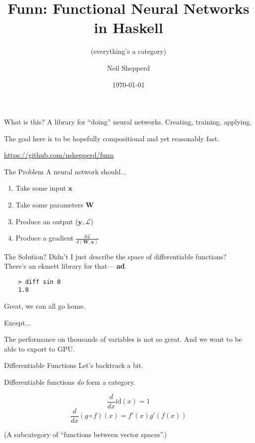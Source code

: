 \documentclass[10pt]{beamer}
\title{Funn: Functional Neural Networks in Haskell}
\subtitle{(everything's a category)}
\date{\today}
\author{Neil Shepperd}
\newenvironment{xframe}[1][]{\begin{frame}[fragile,environment=xframe,#1]}{\end{frame}}
\begin{document}
\maketitle

\begin{xframe}{What is this?}
  A library for ``doing'' neural networks. Creating, training, applying.

  The goal here is to be hopefully compositional and yet reasonably fast.

  \url{https://github.com/nshepperd/funn}
\end{xframe}

\begin{xframe}{The Problem}
  A neural network should...
  \pause
  \begin{enumerate}
  \item Take some input $\mathbf{x}$ \pause
  \item Take some parameters $\mathbf{W}$ \pause
  \item Produce an output ($\mathbf{y}, \mathcal{L}$) \pause
  \item Produce a gradient $\frac{d\mathcal{L}}{d(\mathbf{W},\mathbf{x})}$
  \end{enumerate}
\end{xframe}

\begin{xframe}{The Solution?}
  Didn't I just describe the space of differentiable functions? \\
  There's an ekmett library for that\texttrademark \pause --- \textbf{ad}.

  \begin{verbatim}
    > diff sin 0
    1.0
  \end{verbatim}

  Great, we can all go home.

  Except...
  \pause

  The performance on thousands of variables is not so great.
  And we want to be able to export to GPU.
\end{xframe}

\begin{xframe}{Differentiable Functions}
  Let's backtrack a bit.

  Differentiable functions \emph{do} form a category.

  \[ \frac{d}{dx} \text{id}(x) = 1 \]
  \[ \frac{d}{dx} (g \circ f)(x) = f'(x) g'(f(x)) \]

  (A subcategory of ``functions between vector spaces''.)
\end{xframe}
\end{document}
